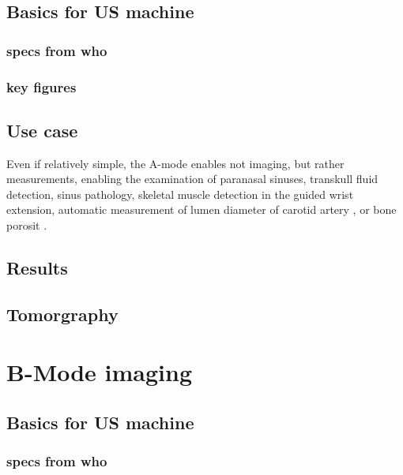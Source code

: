 \documentclass[conference]{IEEEtran}
\begin{document}
\subsection{Basics for US machine}

\subsubsection{specs from who}

\subsubsection{key figures}

\subsection{Use case}


Even if relatively simple, the A-mode enables not imaging, but rather measurements, enabling the examination of paranasal sinuses, transkull fluid detection, sinus pathology, skeletal muscle detection in the guided wrist extension, automatic measurement of lumen diameter of carotid artery \cite{li_new_2014}, or bone porosit \cite{wahab_design_2016}.



\subsection{Results}






\subsection{Tomorgraphy}

\cite{kuzmin_fast_2016}


\section{B-Mode imaging}

\subsection{Basics for US machine}

\subsubsection{specs from who}
\end{document}
